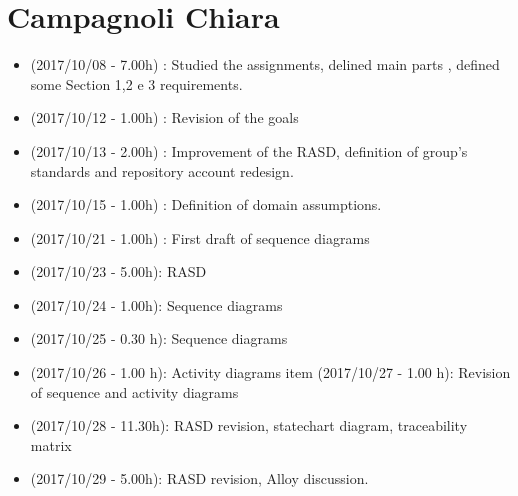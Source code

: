 \documentclass[a4paper,leqno]{book}
\begin{document}
\section{Campagnoli Chiara}
\begin{itemize}
\item (2017/10/08 - 7.00h) : Studied the assignments, delined main parts , defined some Section 1,2 e 3 requirements.
\item (2017/10/12 - 1.00h) : Revision of the goals 
\item (2017/10/13 - 2.00h) : Improvement of the RASD, definition of group's standards and repository account redesign.
\item (2017/10/15 - 1.00h) : Definition of domain assumptions.
\item (2017/10/21 - 1.00h) : First draft of sequence diagrams
\item (2017/10/23 - 5.00h): RASD
\item (2017/10/24 - 1.00h): Sequence diagrams
\item (2017/10/25 - 0.30 h): Sequence diagrams
\item (2017/10/26 - 1.00 h): Activity diagrams
item (2017/10/27 - 1.00 h): Revision of sequence and activity diagrams
\item (2017/10/28 - 11.30h): RASD revision, statechart diagram, traceability matrix
\item (2017/10/29 - 5.00h): RASD revision, Alloy discussion.
\end{itemize}
\end{document}
